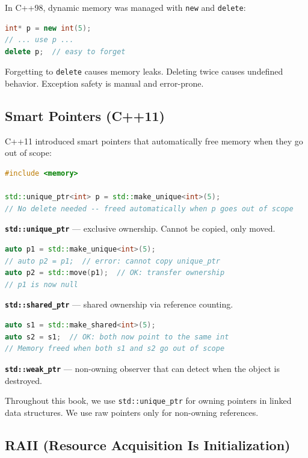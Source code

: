 In C++98, dynamic memory was managed with \texttt{new} and \texttt{delete}:

\begin{lstlisting}[language=C++]
int* p = new int(5);
// ... use p ...
delete p;  // easy to forget
\end{lstlisting}

Forgetting to \texttt{delete} causes memory leaks. Deleting twice causes undefined behavior. Exception safety is manual and error-prone.

\subsection{Smart Pointers (C++11)}

C++11 introduced smart pointers that automatically free memory when they go out of scope:

\begin{lstlisting}[language=C++]
#include <memory>

std::unique_ptr<int> p = std::make_unique<int>(5);
// No delete needed -- freed automatically when p goes out of scope
\end{lstlisting}

\textbf{\texttt{std::unique\_ptr}} — exclusive ownership. Cannot be copied, only moved.

\begin{lstlisting}[language=C++]
auto p1 = std::make_unique<int>(5);
// auto p2 = p1;  // error: cannot copy unique_ptr
auto p2 = std::move(p1);  // OK: transfer ownership
// p1 is now null
\end{lstlisting}

\textbf{\texttt{std::shared\_ptr}} — shared ownership via reference counting.

\begin{lstlisting}[language=C++]
auto s1 = std::make_shared<int>(5);
auto s2 = s1;  // OK: both now point to the same int
// Memory freed when both s1 and s2 go out of scope
\end{lstlisting}

\textbf{\texttt{std::weak\_ptr}} — non-owning observer that can detect when the object is destroyed.

Throughout this book, we use \texttt{std::unique\_ptr} for owning pointers in linked data structures. We use raw pointers only for non-owning references.

\subsection{RAII (Resource Acquisition Is Initialization)}

